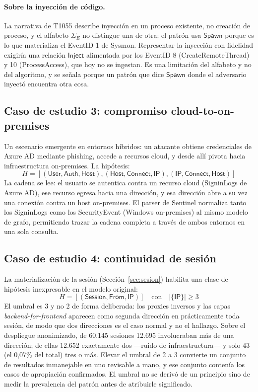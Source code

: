 \documentclass[11pt,a4paper]{article}
\begin{document}
\paragraph{Sobre la inyección de código.} La narrativa de T1055 describe
inyección en un proceso existente, no creación de proceso, y el alfabeto
$\Sigma_E$ no distingue una de otra: el patrón usa $\mathsf{Spawn}$ porque es
lo que materializa el EventID 1 de Sysmon. Representar la inyección con
fidelidad exigiría una relación $\mathsf{Inject}$ alimentada por los EventID 8
(CreateRemoteThread) y 10 (ProcessAccess), que hoy no se ingestan. Es una
limitación del alfabeto y no del algoritmo, y se señala porque un patrón que
dice $\mathsf{Spawn}$ donde el adversario inyectó encuentra otra cosa.

\subsection{Caso de estudio 3: compromiso cloud-to-on-premises}
Un escenario emergente en entornos híbridos: un atacante obtiene credenciales
de Azure AD mediante phishing, accede a recursos cloud, y desde allí pivota
hacia infraestructura on-premises. La hipótesis:
\[
H = [(\mathsf{User}, \mathsf{Auth}, \mathsf{Host}),
(\mathsf{Host}, \mathsf{Connect}, \mathsf{IP}),
(\mathsf{IP}, \mathsf{Connect}, \mathsf{Host})]
\]
La cadena se lee: el usuario se autentica contra un recurso cloud (SigninLogs
de Azure AD), ese recurso egresa hacia una dirección, y esa dirección abre a su
vez una conexión contra un host on-premises. El parser de Sentinel normaliza
tanto los SigninLogs como los SecurityEvent (Windows on-premises) al mismo
modelo de grafo, permitiendo trazar la cadena completa a través de ambos
entornos en una sola consulta.

\subsection{Caso de estudio 4: continuidad de sesión}
La materialización de la sesión (Sección~\ref{sec:sesion}) habilita una clase
de hipótesis inexpresable en el modelo original:
\[
H = [(\mathsf{Session}, \mathsf{From}, \mathsf{IP})] \quad \text{con}
\quad |\{\mathsf{IP}\}| \geq 3
\]
El umbral es 3 y no 2 de forma deliberada: los proxies inversos y las capas
\emph{backend-for-frontend} aparecen como segunda dirección en prácticamente
toda sesión, de modo que dos direcciones es el caso normal y no el hallazgo.
Sobre el despliegue anonimizado, de 60.145 sesiones 12.695 involucraban más de
una dirección; de ellas 12.652 exactamente dos ---ruido de infraestructura--- y
solo 43 (el 0,07\% del total) tres o más. Elevar el umbral de 2 a 3 convierte
un conjunto de resultados inmanejable en uno revisable a mano, y ese conjunto
contenía los casos de apropiación confirmados. El umbral no se derivó de un
principio sino de medir la prevalencia del patrón antes de atribuirle
significado.
\end{document}
